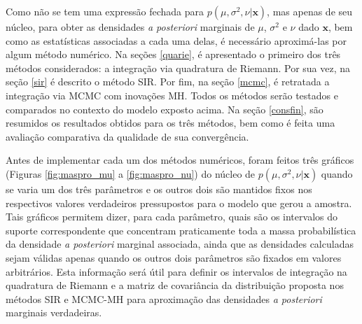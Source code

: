 Como não se tem uma expressão fechada para $p(\mu, \sigma^2, \nu | \bm{x})$, mas apenas de seu núcleo, para obter as densidades \textit{a posteriori} marginais de $\mu$, $\sigma^2$ e $\nu$ dado $\bm{x}$, bem como as estatísticas associadas a cada uma delas, é necessário aproximá-las por algum método numérico. Na seções \ref{quarie}, é apresentado o primeiro dos três métodos considerados: a integração via quadratura de Riemann. Por sua vez, na seção \ref{sir} é descrito o método SIR. Por fim, na seção \ref{mcmc}, é retratada a integração via MCMC com inovações MH. Todos os métodos serão testados e comparados no contexto do modelo exposto acima. Na seção \ref{consfin}, são resumidos os resultados obtidos para os três métodos, bem como é feita uma avaliação comparativa da qualidade de sua convergência.

Antes de implementar cada um dos métodos numéricos, foram feitos três gráficos (Figuras \ref{fig:maspro_mu} a \ref{fig:maspro_nu}) do núcleo de $p(\mu, \sigma^2, \nu | \bm{x})$ quando se varia um dos três parâmetros e os outros dois são mantidos fixos nos respectivos valores verdadeiros pressupostos para o modelo que gerou a amostra. Tais gráficos permitem dizer, para cada parâmetro, quais são os intervalos do suporte correspondente que concentram praticamente toda a massa probabilística da densidade \textit{a posteriori} marginal associada, ainda que as densidades calculadas sejam válidas apenas quando os outros dois parâmetros são fixados em valores arbitrários. Esta informação será útil para definir os intervalos de integração na quadratura de Riemann e a matriz de covariância da distribuição proposta nos métodos SIR e MCMC-MH para aproximação das densidades \textit{a posteriori} marginais verdadeiras.

